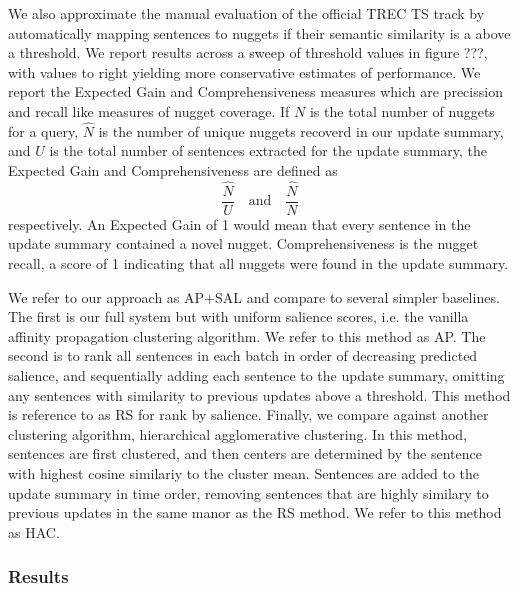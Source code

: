     
    We also approximate the manual evaluation of the official TREC TS track
    by automatically mapping sentences to nuggets if their semantic similarity
    is a above a threshold. We report results across a sweep of threshold 
    values in figure ???, with values to right yielding more conservative
    estimates of performance. We report the Expected Gain and Comprehensiveness
    measures which are precission and recall like measures of nugget 
    coverage. If $N$ is the total number of nuggets for a query, $\hat{N}$ is 
    the number of unique nuggets recoverd in our 
    update 
    summary, and $U$ is the total number of sentences extracted for the update
    summary, the Expected Gain and Comprehensiveness are defined as
    \[ \frac{\hat{N}}{U} \quad \textrm{and} \quad \frac{\hat{N}}{N} \]
    respectively. An Expected Gain of 1 would mean that every sentence in
    the update summary contained a novel nugget. Comprehensiveness is the 
    nugget recall, a score of 1 indicating that all nuggets were found
    in the update summary.
    

    We refer to our approach as AP+SAL and compare to several simpler 
    baselines.
    The first is our full system but with uniform salience scores, i.e.
    the vanilla affinity propagation clustering algorithm. We refer to
    this method as AP.
    The second is to rank all sentences in each batch in order of decreasing
    predicted
    salience, and sequentially adding each sentence to the update summary, 
    omitting
    any sentences with similarity to previous updates above a threshold.
    This method is reference to as RS for rank by salience.
    Finally, we compare against another clustering algorithm,
    hierarchical agglomerative clustering.
    In this method, sentences are first clustered, 
    and then centers are determined by the sentence
    with  highest  cosine  similariy  to  the  cluster
    mean. 
    Sentences are added to the update summary in time order, 
    removing sentences that are highly similary to previous updates in the
    same manor as the RS method. We refer to this method as HAC.

    \subsubsection{Results}


